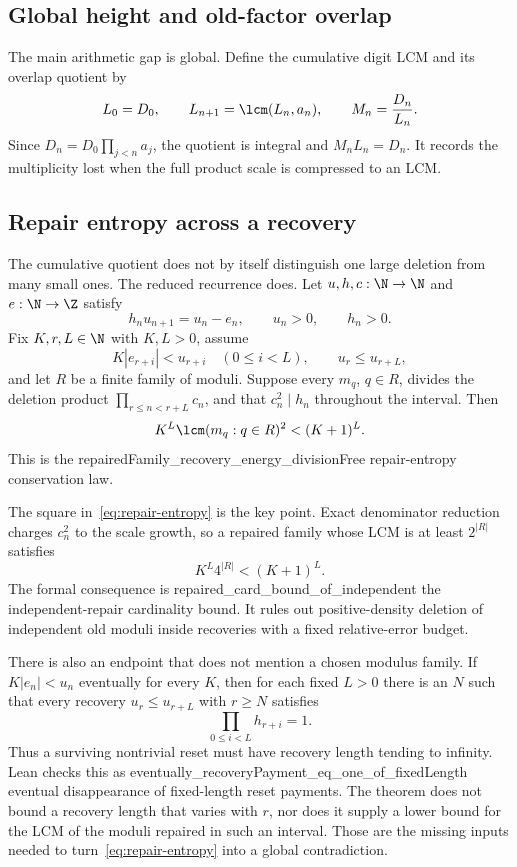 \subsection{Global height and old-factor overlap}

The main arithmetic gap is global.  Define the cumulative digit LCM and its
overlap quotient by
\[
 L_0=D_0,\qquad L_{n+1}=\lcm(L_n,a_n),\qquad M_n=\frac{D_n}{L_n}.
\]
Since $D_n=D_0\prod_{j<n}a_j$, the quotient is integral and
$M_nL_n=D_n$.  It records the multiplicity lost when the full product scale
is compressed to an LCM.

\subsection{Repair entropy across a recovery}

The cumulative quotient does not by itself distinguish one large deletion
from many small ones.  The reduced recurrence does.  Let $u,h,c:\N\to\N$ and
$e:\N\to\Z$ satisfy
\[
 h_nu_{n+1}=u_n-e_n,
 \qquad u_n>0,
 \qquad h_n>0.
\]
Fix $K,r,L\in\N$ with $K,L>0$, assume
\[
 K|e_{r+i}|<u_{r+i}\quad(0\le i<L),
 \qquad u_r\le u_{r+L},
\]
and let $R$ be a finite family of moduli.  Suppose every $m_q$, $q\in R$,
divides the deletion product $\prod_{r\le n<r+L}c_n$, and that
$c_n^2\mid h_n$ throughout the interval.  Then
\begin{equation}\label{eq:repair-entropy}
 K^L\lcm(m_q:q\in R)^2<(K+1)^L.
\end{equation}
This is the
      {repairedFamily_recovery_energy_divisionFree}
      {repair-entropy conservation law}.

The square in~\eqref{eq:repair-entropy} is the key point.  Exact denominator
reduction charges $c_n^2$ to the scale growth, so a repaired family whose LCM
is at least $2^{|R|}$ satisfies
\[
 K^L4^{|R|}<(K+1)^L.
\]
The formal consequence is
      {repaired_card_bound_of_independent}
      {the independent-repair cardinality bound}.
It rules out positive-density deletion of independent old moduli inside
recoveries with a fixed relative-error budget.

There is also an endpoint that does not mention a chosen modulus family.  If
$K|e_n|<u_n$ eventually for every $K$, then for each fixed $L>0$ there is an
$N$ such that every recovery $u_r\le u_{r+L}$ with $r\ge N$ satisfies
\[
 \prod_{0\le i<L}h_{r+i}=1.
\]
Thus a surviving nontrivial reset must have recovery length tending to
infinity.  Lean checks this as
      {eventually_recoveryPayment_eq_one_of_fixedLength}
      {eventual disappearance of fixed-length reset payments}.
The theorem does not bound a recovery length that varies with $r$, nor does it
supply a lower bound for the LCM of the moduli repaired in such an interval.
Those are the missing inputs needed to turn~\eqref{eq:repair-entropy} into a
global contradiction.

